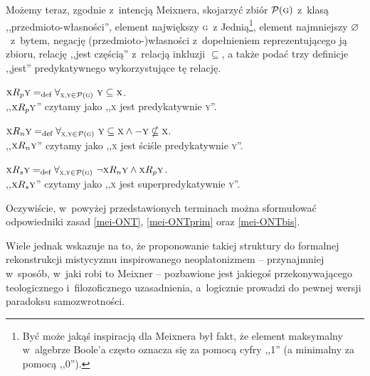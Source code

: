 Możemy teraz, zgodnie z~intencją Meixnera, skojarzyć zbiór $\mathcal{P}(\textsc{g})$ z~klasą ,,przedmioto-własności'', element największy \textsc{g}~z Jednią\footnote{Być może jakąś inspiracją dla Meixnera był fakt, że element maksymalny w~algebrze Boole'a często oznacza się za pomocą cyfry ,,1'' (a minimalny za pomocą ,,0'').}, element najmniejszy $\varnothing$~z~bytem, negację (przedmioto-)własności z~dopełnieniem reprezentującego ją zbioru, relację ,,jest częścią'' z~relacją inkluzji $\subseteq$, a także podać trzy definicje ,,jest'' predykatywnego wykorzystujące tę relację.
\begin{defin}
$\textsc{x}R_p\textsc{y} =_{\text{def}} \forall_{\textsc{x,y}\in\mathcal{P}(\textsc{g})}\ \textsc{y} \subseteq \textsc{x}$.\\
,,$\textsc{x}R_p\textsc{y}$'' czytamy jako ,,\textsc{x} jest predykatywnie \textsc{y}''.
\end{defin}
\begin{defin}
$\textsc{x}R_n\textsc{y} =_{\text{def}} \forall_{\textsc{x,y}\in\mathcal{P}(\textsc{g})}\  \textsc{y} \subseteq \textsc{x} \land -\textsc{y} \nsubseteq \textsc{x}$.\\
,,$\textsc{x}R_n\textsc{y}$'' czytamy jako ,,\textsc{x} jest ściśle predykatywnie \textsc{y}''.
\end{defin}
\begin{defin}
$\textsc{x}R_s\textsc{y} =_{\text{def}} \forall_{\textsc{x,y}\in\mathcal{P}(\textsc{g})}\  \neg \textsc{x}R_n\textsc{y} \land \textsc{x}R_p\textsc{y}$.\\
,,$\textsc{x}R_s\textsc{y}$'' czytamy jako ,,\textsc{x} jest superpredykatywnie \textsc{y}''.
\end{defin}%
%
%
%
\noindent Oczywiście, w~powyżej przedstawionych terminach można sformułować odpowiedniki zasad \ref{mei-ONT}, \ref{mei-ONTprim} oraz \ref{mei-ONTbis}.

Wiele jednak wskazuje na to, że proponowanie takiej struktury do formalnej rekonstrukcji mistycyzmu inspirowanego neoplatonizmem -- przynajmniej w~sposób, w~jaki robi to Meixner -- pozbawione jest jakiegoś przekonywającego teologicznego i~filozoficznego uzasadnienia, a~logicznie prowadzi do pewnej wersji paradoksu samozwrotności.

